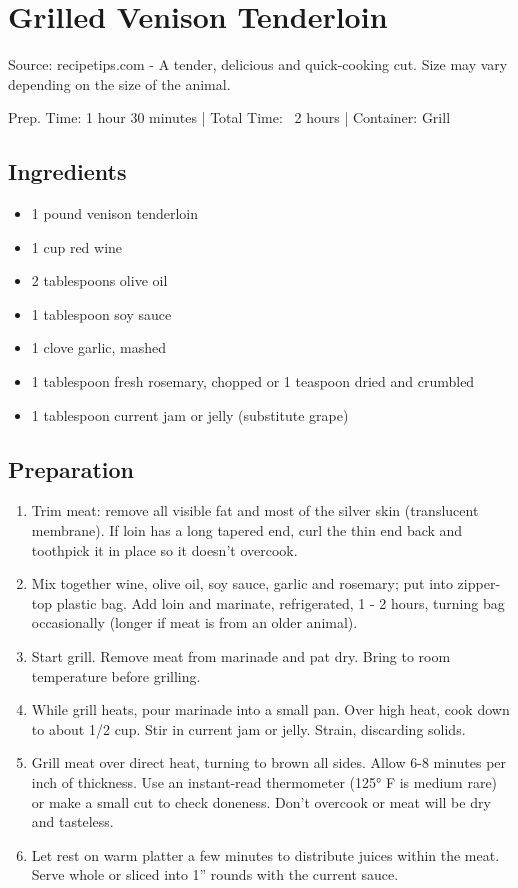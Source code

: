 \section{Grilled Venison Tenderloin}

Source: recipetips.com - A tender, delicious and quick-cooking cut. Size may vary depending on the size of the animal.

\noindent Prep. Time: 1 hour 30 minutes |
Total Time: ~2 hours | 
Container: Grill

\subsection{Ingredients}
\begin{itemize}
    \item 1 pound venison tenderloin
    \item 1 cup red wine
    \item 2 tablespoons olive oil
    \item 1 tablespoon soy sauce
    \item 1 clove garlic, mashed
    \item 1 tablespoon fresh rosemary, chopped or 1 teaspoon dried and crumbled
    \item 1 tablespoon current jam or jelly (substitute grape)
\end{itemize}

\subsection{Preparation}
\begin{enumerate}
    \item Trim meat: remove all visible fat and most of the silver skin (translucent membrane). If loin has a long tapered end, curl the thin end back and toothpick it in place so it doesn't overcook.
    \item Mix together wine, olive oil, soy sauce, garlic and rosemary; put into zipper-top plastic bag. Add loin and marinate, refrigerated, 1 - 2 hours, turning bag occasionally (longer if meat is from an older animal).
    \item Start grill. Remove meat from marinade and pat dry. Bring to room temperature before grilling.
    \item While grill heats, pour marinade into a small pan. Over high heat, cook down to about 1/2 cup. Stir in current jam or jelly. Strain, discarding solids.
    \item Grill meat over direct heat, turning to brown all sides. Allow 6-8 minutes per inch of thickness. Use an instant-read thermometer (125° F is medium rare) or make a small cut to check doneness. Don't overcook or meat will be dry and tasteless.
    \item Let rest on warm platter a few minutes to distribute juices within the meat. Serve whole or sliced into 1'' rounds with the current sauce.

\end{enumerate}

